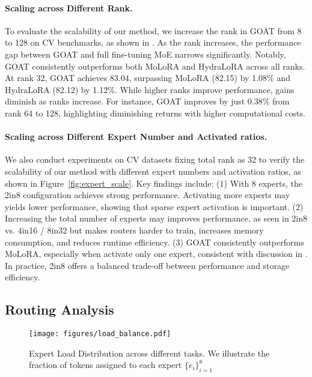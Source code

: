 \paragraph{Scaling across Different Rank.} To evaluate the scalability of our method, we increase the rank in GOAT from 8 to 128 on CV benchmarks, as shown in . As the rank increases, the performance gap between GOAT and full fine-tuning MoE narrows significantly. Notably, GOAT consistently outperforms both MoLoRA and HydraLoRA across all ranks. At rank 32, GOAT achieves 83.04, surpassing MoLoRA (82.15) by 1.08\% and HydraLoRA (82.12) by 1.12\%. While higher ranks improve performance, gains diminish as ranks increase. For instance, GOAT improves by just 0.38\% from rank 64 to 128, highlighting diminishing returns with higher computational costs.



\paragraph{Scaling across Different Expert Number and Activated ratios.}
We also conduct experiments on CV datasets fixing total rank as 32 to verify the scalability of our method with different expert numbers and activation ratios, as shown in Figure~\ref{fig:expert_scale}. Key findings include:
(1) With 8 experts, the 2in8 configuration achieves strong performance. Activating more experts may yields lower performance, showing that sparse expert activation is important.
(2) Increasing the total number of experts may improves performance, as seen in 2in8 vs. 4in16 / 8in32 but makes routers harder to train, increases memory consumption, and reduces runtime efficiency. 
(3) GOAT consistently outperforms MoLoRA, especially when activate only one expert, consistent with discussion in .
In practice, 2in8 offers a balanced trade-off between performance and storage efficiency. 

\subsection{Routing Analysis}

\begin{figure}[h]
\vspace{-5pt}
    \centering
    \texttt{[image: figures/load\_balance.pdf]}
    \vspace{-3mm}
    \caption{Expert Load Distribution across different tasks. We illustrate the fraction of tokens assigned to each expert $\{e_i\}_{i=1}^8$}
    \label{fig:load}
    \vspace{-4mm}
\end{figure}

